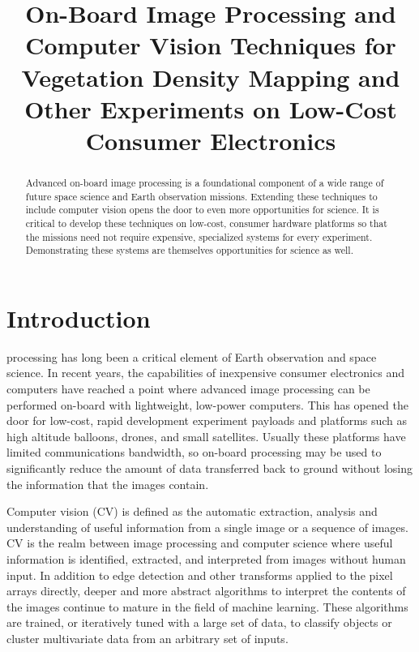 \documentclass[conference]{IEEEtran} %
\title{On-Board Image Processing and Computer Vision Techniques for Vegetation Density Mapping and Other Experiments on Low-Cost Consumer Electronics}
\author{
   \IEEEauthorblockN{%
    Jeff~Maggio\IEEEauthorrefmark{1},
    Philip~Linden\IEEEauthorrefmark{2},
    T.J.~Tarazevits\IEEEauthorrefmark{3}
  }
  \IEEEauthorblockA{%
    RIT Space Exploration, Rochester Institute of Technology \\ %
    Rochester, N.Y. \\
    Email:
    \IEEEauthorrefmark{1}jxm9264.rit.edu,
    \IEEEauthorrefmark{2}pjl7651@rit.edu,
    \IEEEauthorrefmark{3}tjt3085@rit.edu
  }
}
\begin{document}
\maketitle%

\begin{abstract}
    Advanced on-board image processing is a foundational component of a wide range of future space science and Earth observation missions.
    Extending these techniques to include computer vision opens the door to even more opportunities for science.
    It is critical to develop these techniques on low-cost, consumer hardware platforms so that the missions need not require expensive, specialized systems for every experiment.
    Demonstrating these systems are themselves opportunities for science as well.
\end{abstract}

\section{Introduction}
\label{sec:introduction}

 processing has long been a critical element of Earth observation and space science.
In recent years, the capabilities of inexpensive consumer electronics and computers have reached a point where advanced image processing can be performed on-board with lightweight, low-power computers.
This has opened the door for low-cost, rapid development experiment payloads and platforms such as high altitude balloons, drones, and small satellites.
Usually these platforms have limited communications bandwidth, so on-board processing may be used to significantly reduce the amount of data transferred back to ground without losing the information that the images contain.

Computer vision (CV) is defined as the automatic extraction, analysis and understanding of useful information from a single image or a sequence of images.
CV is the realm between image processing and computer science where useful information is identified, extracted, and interpreted from images without human input.
In addition to edge detection and other transforms applied to the pixel arrays directly, deeper and more abstract algorithms to interpret the contents of the images continue to mature in the field of machine learning.
These algorithms are trained, or iteratively tuned with a large set of data, to classify objects or cluster multivariate data from an arbitrary set of inputs.
\end{document}

